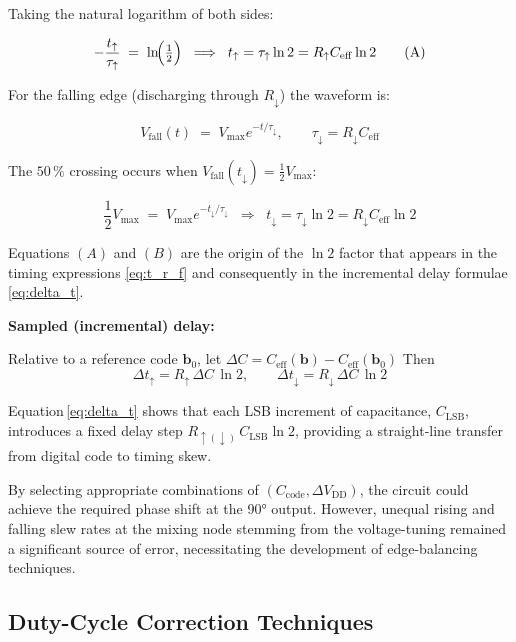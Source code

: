 Taking the natural logarithm of both sides:

\[
-\frac{t_{\uparrow}}{\tau_{\uparrow}}
      \;=\;
      \ln\!\Bigl(\tfrac{1}{2}\Bigr)
\;\;\Longrightarrow\;\;
t_{\uparrow}= \tau_{\uparrow}\ln 2
            = R_{\uparrow}C_{\mathrm{eff}}\ln 2
\tag{A}
\]

For the falling edge (discharging through \(R_{\downarrow}\)) the
waveform is:

\[
V_\text{fall}(t) \;=\; V_{\max}e^{-t/\tau_{\downarrow}},
\qquad
\tau_{\downarrow}=R_{\downarrow}C_{\mathrm{eff}}
\]

The \(50\,\%\) crossing occurs when \(V_\text{fall}(t_{\downarrow}) =
\tfrac{1}{2}V_{\max}\):

\[
\frac{1}{2}V_{\max}
      \;=\;
      V_{\max}e^{-t_{\downarrow}/\tau_{\downarrow}}
\;\;\Longrightarrow\;\;
t_{\downarrow}= \tau_{\downarrow}\ln 2
              = R_{\downarrow}C_{\mathrm{eff}}\ln 2
\tag{B}
\]

Equations \((A)\) and \((B)\) are the origin of the \(\ln 2\) factor that
appears in the timing expressions \eqref{eq:t_r_f} and consequently in the
incremental delay formulae \eqref{eq:delta_t}.

\textbf{Sampled (incremental) delay:}

Relative to a reference code $\mathbf{b}_0$,
let $\Delta C = C_{\mathrm{eff}}(\mathbf{b}) -
                C_{\mathrm{eff}}(\mathbf{b}_0)$
Then
\begin{equation}
\Delta t_{\uparrow} = R_{\uparrow}\,\Delta C\,\ln 2,
\qquad
\Delta t_{\downarrow}= R_{\downarrow}\,\Delta C\,\ln 2
\label{eq:delta_t}
\end{equation}

Equation\,\eqref{eq:delta_t} shows that each LSB increment of
capacitance, $C_{\mathrm{LSB}}$, introduces a fixed delay step
$R_{\uparrow(\downarrow)}\,C_{\mathrm{LSB}}\ln 2$, providing a
straight‑line transfer from digital code to timing skew.


By selecting appropriate combinations of $(C_\text{code},\Delta V_\text{DD})$, the circuit could achieve the required phase shift at the \ang{90} output. However, unequal rising and falling slew rates at the mixing node stemming from the voltage-tuning remained a significant source of error, necessitating the development of edge-balancing techniques.

\subsection{Duty-Cycle Correction Techniques}\label{sec:dcc}

